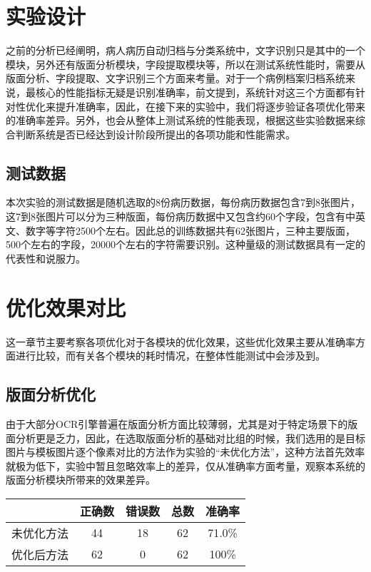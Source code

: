 \section{实验设计}
\label{sec:experiment-design}
之前的分析已经阐明，病人病历自动归档与分类系统中，文字识别只是其中的一个模块，另外还有版面分析模块，字段提取模块等，所以在测试系统性能时，需要从版面分析、字段提取、文字识别三个方面来考量。对于一个病例档案归档系统来说，最核心的性能指标无疑是识别准确率，前文提到，系统针对这三个方面都有针对性优化来提升准确率，因此，在接下来的实验中，我们将逐步验证各项优化带来的准确率差异。另外，也会从整体上测试系统的性能表现，根据这些实验数据来综合判断系统是否已经达到设计阶段所提出的各项功能和性能需求。
\subsection*{测试数据}
本次实验的测试数据是随机选取的8份病历数据，每份病历数据包含7到8张图片，这7到8张图片可以分为三种版面，每份病历数据中又包含约60个字段，包含有中英文、数字等字符2500个左右。因此总的训练数据共有62张图片，三种主要版面，500个左右的字段，20000个左右的字符需要识别。这种量级的测试数据具有一定的代表性和说服力。
\section{优化效果对比}
这一章节主要考察各项优化对于各模块的优化效果，这些优化效果主要从准确率方面进行比较，而有关各个模块的耗时情况，在整体性能测试中会涉及到。
\subsection{版面分析优化}
由于大部分OCR引擎普遍在版面分析方面比较薄弱，尤其是对于特定场景下的版面分析更是乏力，因此，在选取版面分析的基础对比组的时候，我们选用的是目标图片与模板图片逐个像素对比的方法作为实验的“未优化方法”，这种方法首先效率就极为低下，实验中暂且忽略效率上的差异，仅从准确率方面考量，观察本系统的版面分析模块所带来的效果差异。
\begin{table}[!htbp]
	\label{layout-analysis-optimization}
	\centering
	\vspace{10pt}
  \renewcommand\arraystretch{1.5}  %
	\begin{tabular}{c||c|c|c|c}
    \hline
    & 正确数 & 错误数 & 总数 & 准确率 \\
		\hline
    未优化方法 & 44 & 18 & 62 & 71.0\% \\
		\hline
    优化后方法 & 62 & 0 & 62 & 100\% \\
    \hline
	\end{tabular}
\end{table}

